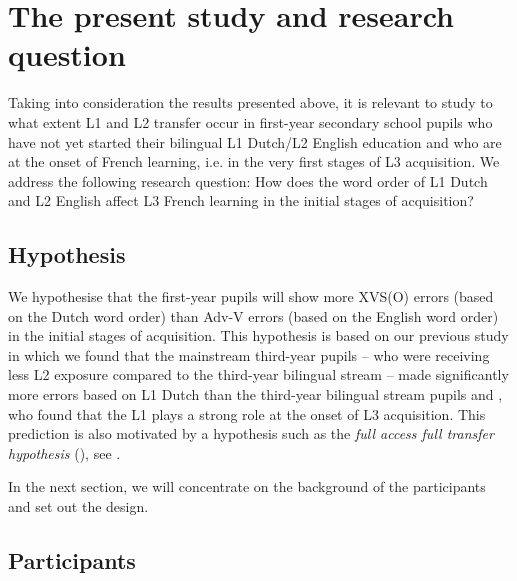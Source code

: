\documentclass[output=paper]{langsci/langscibook}
\begin{document}
\section{{The present study and research question}}%
\label{sec:stadt:3}

Taking into consideration the results presented above, it is relevant to study to what extent L1 and L2 transfer occur in first-year secondary school pupils who have not yet started their bilingual L1 Dutch/L2 English education and who are at the onset of French learning, i.e. in the very first stages of L3 acquisition. We address the following research question: How does the word order of L1 Dutch and L2 English affect L3 French learning in the initial stages of acquisition?

\subsection{Hypothesis}%
\label{sec:stadt:3.1}

We hypothesise that the first-year pupils will show more XVS(O) errors (based on the Dutch word order) than Adv-V errors (based on the English word order) in the initial stages of acquisition. This hypothesis is based on our previous study \citep{StadtEtAl2016} in which we found that the mainstream third-year pupils – who were receiving less L2 exposure compared to the third-year bilingual stream – made significantly more errors based on L1 Dutch than the third-year bilingual stream pupils and \citet{Hermas2010, Hermas2014Morphosyntax, Hermas2014Relatives}, who found that the L1 plays a strong role at the onset of L3 acquisition. This prediction is also motivated by a hypothesis such as the \textit{full access full transfer hypothesis} (\citealt{SchwartzSprouse1996}), see .

In the next section, we will concentrate on the background of the participants and set out the design.

\subsection{{Participants}}
\label{sec:stadt:3.2}
\end{document}
